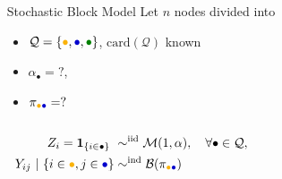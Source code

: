 \documentclass{beamer}\usepackage[]{graphicx}\usepackage[]{color}
\begin{document}
\begin{frame}
\begin{center}
\begin{overlayarea}{\textwidth}{.5\textheight}
\begin{columns}
\begin{column}{.45\paperwidth}
        \end{column}
        \begin{column}{.5\paperwidth}
          \begin{small}
            \begin{block}{Stochastic Block Model}
              Let $n$ nodes divided into
              \begin{itemize}
              \item
                $\mathcal{Q}=\{\textcolor{yellow!40!orange}{\bullet},\textcolor{blue!80!black}{\bullet},\textcolor{green!50!black}{\bullet}\}$,
                $\text{card}(\mathcal{Q})$ known
              \item  $\alpha_\bullet  =  ?$,
              \item      $\pi_{\textcolor{yellow!40!orange}{\bullet}\textcolor{blue!80!black}{\bullet}}     =      ?$
              \end{itemize}
            \end{block}
          \end{small}
        \end{column}
      \end{columns}
    \end{overlayarea}
    \end{center}

  \begin{align*}
    Z_i = \mathbf{1}_{\{i \in \bullet\}}  \ & \sim^{\text{iid}} \mathcal{M}(1,\alpha), \quad \forall\bullet\in\mathcal{Q}, \\
    Y_{ij} \ | \ \{i\in\textcolor{yellow!40!orange}{\bullet},j\in\textcolor{blue!80!black}{\bullet}\} & \sim^{\text{ind}} \mathcal{B}(\pi_{\textcolor{yellow!40!orange}{\bullet}\textcolor{blue!80!black}{\bullet}})\\
  \end{align*}

\end{frame}
\end{document}
